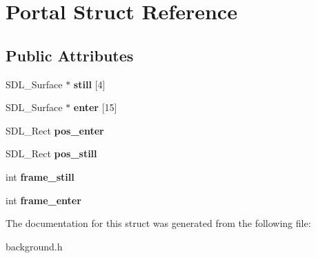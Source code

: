 \hypertarget{structPortal}{}\section{Portal Struct Reference}
\label{structPortal}
\subsection*{Public Attributes}
\begin{DoxyCompactItemize}
\item 
\mbox{\label{structPortal_a77ddecc0900365f5ca013351d32fc9ee}} 
S\+D\+L\+\_\+\+Surface $\ast$ {\bfseries still} \mbox{[}4\mbox{]}
\item 
\mbox{\label{structPortal_ab57554378c76f1c1d35022280aa250a1}} 
S\+D\+L\+\_\+\+Surface $\ast$ {\bfseries enter} \mbox{[}15\mbox{]}
\item 
\mbox{\label{structPortal_a241b257fc05abc880eca67c0db1e52ea}} 
S\+D\+L\+\_\+\+Rect {\bfseries pos\+\_\+enter}
\item 
\mbox{\label{structPortal_a3cfcaf2bd0b3f229a073b7e7f1f2dc08}} 
S\+D\+L\+\_\+\+Rect {\bfseries pos\+\_\+still}
\item 
\mbox{\label{structPortal_ab3181fde5c8374c3c461f824b948221f}} 
int {\bfseries frame\+\_\+still}
\item 
\mbox{\label{structPortal_a5aab8cbcf440db0c100ab2e8fb267bf8}} 
int {\bfseries frame\+\_\+enter}
\end{DoxyCompactItemize}


The documentation for this struct was generated from the following file\+:\begin{DoxyCompactItemize}
\item 
background.\+h\end{DoxyCompactItemize}
